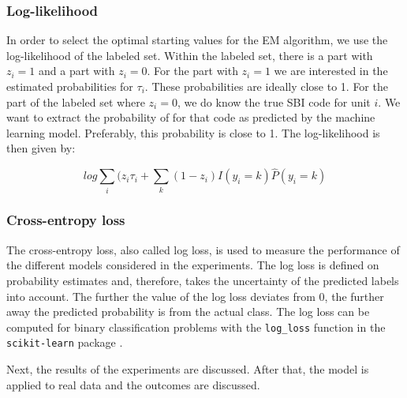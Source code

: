 \documentclass[12pt, a4paper, titlepage]{article}
\begin{document}
\subsubsection{Log-likelihood}
In order to select the optimal starting values for the EM algorithm, we use the log-likelihood of the labeled set. Within the labeled set, there is a part with $z_i = 1$ and a part with $z_i = 0$. For the part with $z_i = 1$ we are interested in the estimated probabilities for $\tau_i$. These probabilities are ideally close to 1. For the part of the labeled set where $z_i = 0$, we do know the true SBI code for unit $i$. We want to extract the probability of for that code as predicted by the machine learning model. Preferably, this probability is close to 1.
The log-likelihood is then given by:

						\begin{equation}\label{log}
log \sum_i (z_i \tau_i + \sum_k (1-z_i)I(y_i = k)\hat{P}(y_i=k)
						\end{equation}

\subsubsection{Cross-entropy loss}
The cross-entropy loss, also called log loss, is used to measure the performance of the different models considered in the experiments. The log loss is defined on probability estimates and, therefore, takes the uncertainty of the predicted labels into account. The further the value of the log loss deviates from 0, the further away the predicted probability is from the actual class. The log loss can be computed for binary classification problems with the \texttt{log\_loss} function in the \texttt{scikit-learn} package \citep{sklearn}. 


\bigskip

Next, the results of the experiments are discussed. After that, the model is applied to real data and the outcomes are discussed.


\clearpage %

 

\end{document}
